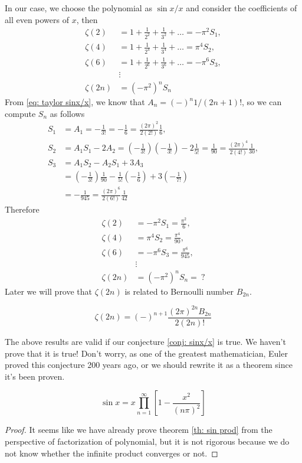 \documentclass[10pt]{article}
\begin{document}
	In our case, we choose the polynomial as $\sin x /x$ and consider the coefficients of all even powers of $x$, then
	\begin{align*}
		\zeta(2) &= 1 + \frac{1}{2^2} + \frac{1}{3^2} + \dots = - \pi^2 S_1, \\
		\zeta(4) &= 1 + \frac{1}{2^4} + \frac{1}{3^4} + \dots = \pi^4 S_2, \\
		\zeta(6) &= 1 + \frac{1}{2^6} + \frac{1}{3^6} + \dots = - \pi^6 S_3, \\
		&\vdots \\
		\zeta(2n) &= (-\pi^2)^n S_n
	\end{align*}
	From \eqref{eq: taylor sinx/x}, we know that $A_n = (-)^n 1/(2n+1)!$, so we can compute $S_n$ as follows
	\begin{align*}
		S_1 &= A_1 = -\frac{1}{3!} = -\frac{1}{6} = \frac{(2\pi)^{2}}{2(2!)} \frac{1}{6}, \\
		S_2 &= A_1 S_1 - 2 A_2 =  \left(-\frac{1}{3!}\right)\left(-\frac{1}{3!}\right) - 2 \frac{1}{5!} = \frac{1}{90} = \frac{(2\pi)^{4}}{2(4!)} \frac{1}{30}, \\
		S_3 &= A_1 S_2 - A_2 S_1 + 3 A_3 \\
		&= \left(-\frac{1}{3!}\right) \frac{1}{90} - \frac{1}{5!} \left(- \frac{1}{6} \right) + 3 \left(-\frac{1}{7!}\right) \\
		&= -\frac{1}{945} = \frac{(2\pi)^{6}}{2(6!)} \frac{1}{42}
	\end{align*}
	Therefore
	\begin{align*}
		\zeta(2) &= - \pi^2 S_1 = \frac{\pi^2}{6}, \\
		\zeta(4) &= \pi^4 S_2 = \frac{\pi^4}{90}, \\
		\zeta(6) &= - \pi^6 S_3 = \frac{\pi^6}{945}, \\
		&\vdots \\
		\zeta(2n) &= (-\pi^2)^n S_n = \ ?
	\end{align*}
	Later we will prove that $\zeta(2n)$ is related to Bernoulli number $B_{2n}$.
	\begin{theorem}
		\begin{equation}
			\zeta(2n) = (-)^{n+1} \frac{(2\pi)^{2n} B_{2n}}{2(2n)!}
		\end{equation}
	\end{theorem}
	The above results are valid if our conjecture \eqref{conj: sinx/x} is true. We haven't prove that it is true! Don't worry, as one of the greatest mathematician, Euler proved this conjecture 200 years ago, or we should rewrite it as a theorem since it's been proven.
	\begin{theorem} \label{th: sin prod}
		\begin{equation}
			\sin x = x \prod_{n=1}^{\infty} \left[ 1 - \frac{x^2}{(n\pi)^2} \right]
		\end{equation}
	\end{theorem}
	\begin{proof}
		It seems like we have already prove theorem \ref{th: sin prod} from the perspective of factorization of polynomial, but it is not rigorous because we do not know whether the infinite product converges or not.
	\end{proof}




	\newpage
\end{document}

